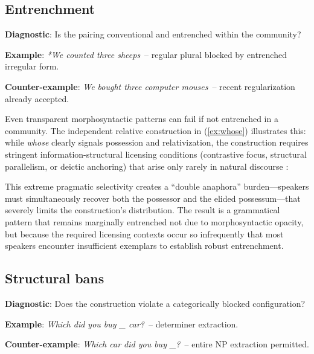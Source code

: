\documentclass[12pt]{article}
\begin{document}
\subsection{Entrenchment}

\begin{tcolorbox}[colback=lsLightBlue!30]
\textbf{Diagnostic}: Is the pairing conventional and entrenched within the community?

\textbf{Example}: \textit{*We counted three sheeps}~-- regular plural blocked by entrenched irregular form.

\textbf{Counter-example}: \textit{We bought three computer mouses}~-- recent regularization already accepted.
\end{tcolorbox}

Even transparent morphosyntactic patterns can fail if not entrenched in a community. The independent relative construction in (\ref{ex:whose}) illustrates this: while \textit{whose} clearly signals possession and relativization, the construction requires stringent information-structural licensing conditions (contrastive focus, structural parallelism, or deictic anchoring) that arise only rarely in natural discourse \autocite{ReynoldsWhose}:

\label{ex:whose}
\z

This extreme pragmatic selectivity creates a \enquote{double anaphora} burden—speakers must simultaneously recover both the possessor and the elided possessum—that severely limits the construction's distribution. The result is a grammatical pattern that remains marginally entrenched not due to morphosyntactic opacity, but because the required licensing contexts occur so infrequently that most speakers encounter insufficient exemplars to establish robust entrenchment.

\subsection{Structural bans}

\begin{tcolorbox}[colback=lsLightBlue!30]
\textbf{Diagnostic}: Does the construction violate a categorically blocked configuration?

\textbf{Example}: \textit{\*Which did you buy \_ car?}~-- determiner extraction.

\textbf{Counter-example}: \textit{Which car did you buy \_?}~-- entire NP extraction permitted.
\end{tcolorbox}
\end{document}
